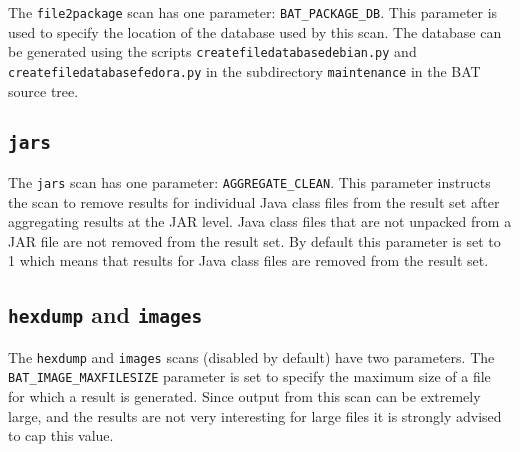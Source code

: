 \documentclass[10pt]{article}
\begin{document}
The \texttt{file2package} scan has one parameter: \texttt{BAT\_PACKAGE\_DB}.
This parameter is used to specify the location of the database used by this
scan. The database can be generated using the scripts
\texttt{createfiledatabasedebian.py} and \texttt{createfiledatabasefedora.py}
in the subdirectory \texttt{maintenance} in the BAT source tree.

\subsection{\texttt{jars}}

The \texttt{jars} scan has one parameter: \texttt{AGGREGATE\_CLEAN}. This
parameter instructs the scan to remove results for individual Java class
files from the result set after aggregating results at the JAR level. Java
class files that are not unpacked from a JAR file are not removed from the
result set. By default this parameter is set to 1 which means that results for
Java class files are removed from the result set.

\subsection{\texttt{hexdump} and \texttt{images}}

The \texttt{hexdump} and \texttt{images} scans (disabled by default) have two
parameters. The \texttt{BAT\_IMAGE\_MAXFILESIZE} parameter is set to specify
the maximum size of a file for which a result is generated. Since output from
this scan can be extremely large, and the results are not very interesting for
large files it is strongly advised to cap this value.
\end{document}
